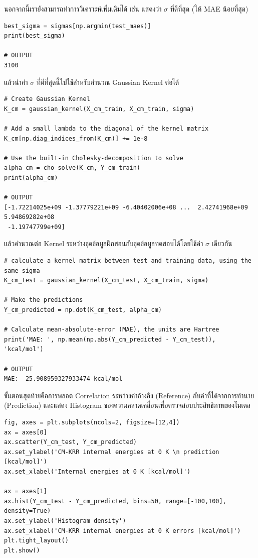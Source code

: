 นอกจากนี้เรายังสามารถทำการวิเคราะห์เพิ่มเติมได้ เช่น แสดงว่า $\sigma$ ที่ดีที่สุด (ให้ MAE น้อยที่สุด)

\begin{lstlisting}[style=MyPython]
best_sigma = sigmas[np.argmin(test_maes)]
print(best_sigma)

# OUTPUT
3100
\end{lstlisting}

\noindent แล้วนำค่า $\sigma$ ที่ดีที่สุดนี้ไปใช้สำหรับคำนวณ Gaussian Kernel ต่อได้

\begin{lstlisting}[style=MyPython]
# Create Gaussian Kernel
K_cm = gaussian_kernel(X_cm_train, X_cm_train, sigma)

# Add a small lambda to the diagonal of the kernel matrix
K_cm[np.diag_indices_from(K_cm)] += 1e-8

# Use the built-in Cholesky-decomposition to solve
alpha_cm = cho_solve(K_cm, Y_cm_train)
print(alpha_cm)

# OUTPUT
[-1.72214025e+09 -1.37779221e+09 -6.40402006e+08 ...  2.42741968e+09  5.94869282e+08
 -1.19747799e+09]
\end{lstlisting}

\noindent แล้วคำนวณต่อ Kernel ระหว่างชุดข้อมูลฝึกสอนกับชุดข้อมูลทดสอบได้โดยใช้ค่า $\sigma$ เดียวกัน

\begin{lstlisting}[style=MyPython]
# calculate a kernel matrix between test and training data, using the same sigma
K_cm_test = gaussian_kernel(X_cm_test, X_cm_train, sigma)

# Make the predictions
Y_cm_predicted = np.dot(K_cm_test, alpha_cm)

# Calculate mean-absolute-error (MAE), the units are Hartree
print('MAE: ', np.mean(np.abs(Y_cm_predicted - Y_cm_test)), 'kcal/mol')

# OUTPUT
MAE:  25.908959327933474 kcal/mol
\end{lstlisting}

ขั้นตอนสุดท้ายคือการพลอต Correlation ระหว่างค่าอ้างอิง (Reference) กับค่าที่ได้จากการทำนาย (Prediction) และแสดง Histogram 
ของความคลาดเคลื่อนเพื่อตรวจสอบประสิทธิภาพของโมเดล

\begin{lstlisting}[style=MyPython]
fig, axes = plt.subplots(ncols=2, figsize=[12,4])
ax = axes[0]
ax.scatter(Y_cm_test, Y_cm_predicted)
ax.set_ylabel('CM-KRR internal energies at 0 K \n prediction [kcal/mol]')
ax.set_xlabel('Internal energies at 0 K [kcal/mol]')

ax = axes[1]
ax.hist(Y_cm_test - Y_cm_predicted, bins=50, range=[-100,100], density=True)
ax.set_ylabel('Histogram density')
ax.set_xlabel('CM-KRR internal energies at 0 K errors [kcal/mol]')
plt.tight_layout()
plt.show()
\end{lstlisting}

